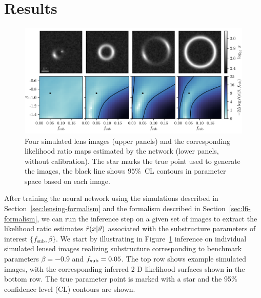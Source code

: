 \documentclass[twocolumn]{aastex63}
\begin{document}
\section{Results}
\label{sec:results}

\begin{figure}[t!]
\centering
\includegraphics[width=1.\textwidth]{figures/individual_lens_predictions}
\caption{Four simulated lens images (upper panels) and the corresponding likelihood ratio maps estimated by the network (lower panels, without calibration). The star marks the true point used to generate the images, the black line shows $95 \%$~CL contours in parameter space based on each image.  }
\label{fig:individual_predictions}
\end{figure}

After training the neural network using the simulations described in Section~\ref{sec:lensing-formalism} and the formalism described in Section~\ref{sec:lfi-formalism}, we can run the inference step on a given set of images to extract the likelihood ratio estimates $\hat r(x | \vartheta)$ associated with the substructure parameters of interest $\{f_\mathrm{sub}, \beta\}$. We start by illustrating in Figure~\ref{fig:individual_predictions} inference on individual simulated lensed images realizing substructure corresponding to benchmark parameters $\beta = -0.9$ and $f_{\mathrm{sub}} = 0.05$. The top row shows example simulated images, with the corresponding inferred 2-D likelihood surfaces shown in the bottom row. The true parameter point is marked with a star and the 95\% confidence level (CL) contours are shown.
\end{document}
